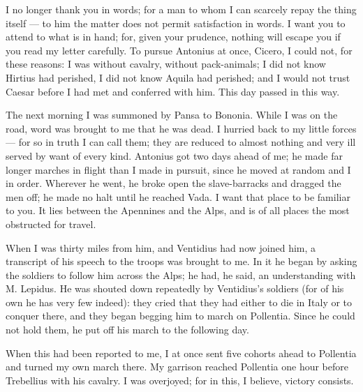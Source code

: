 

 I no longer thank you in words; for a man to whom I can scarcely repay the thing itself --- to him the matter does not permit satisfaction in words. I want you to attend to what is in hand; for, given your prudence, nothing will escape you if you read my letter carefully. To pursue Antonius at once, Cicero, I could not, for these reasons: I was without cavalry, without pack-animals; I did not know Hirtius had perished, I did not know Aquila had perished; and I would not trust Caesar before I had met and conferred with him. This day passed in this way.

 The next morning I was summoned by Pansa to Bononia. While I was on the road, word was brought to me that he was dead. I hurried back to my little forces --- for so in truth I can call them; they are reduced to almost nothing and very ill served by want of every kind. Antonius got two days ahead of me; he made far longer marches in flight than I made in pursuit, since he moved at random and I in order. Wherever he went, he broke open the slave-barracks and dragged the men off; he made no halt until he reached Vada. I want that place to be familiar to you. It lies between the Apennines and the Alps, and is of all places the most obstructed for travel.

 When I was thirty miles from him, and Ventidius had now joined him, a transcript of his speech to the troops was brought to me. In it he began by asking the soldiers to follow him across the Alps; he had, he said, an understanding with M. Lepidus. He was shouted down repeatedly by Ventidius's soldiers (for of his own he has very few indeed): they cried that they had either to die in Italy or to conquer there, and they began begging him to march on Pollentia. Since he could not hold them, he put off his march to the following day.

 When this had been reported to me, I at once sent five cohorts ahead to Pollentia and turned my own march there. My garrison reached Pollentia one hour before Trebellius with his cavalry. I was overjoyed; for in this, I believe, victory consists.
